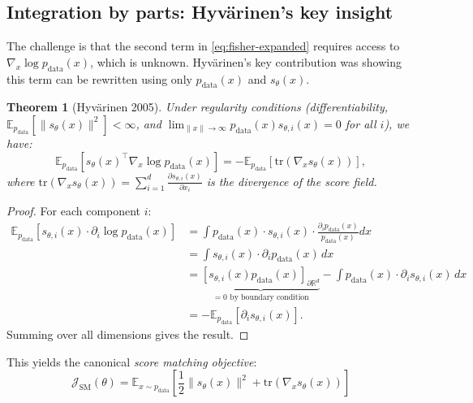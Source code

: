 \documentclass[11pt]{article}
\newtheorem{theorem}{Theorem}[section]
\theoremstyle{definition}
\begin{document}
\subsection{Integration by parts: Hyv\"arinen's key insight}
The challenge is that the second term in \eqref{eq:fisher-expanded} requires access to $\nabla_x \log p_{\text{data}}(x)$, which is unknown. 
Hyv\"arinen's key contribution was showing this term can be rewritten using only $p_{\text{data}}(x)$ and $s_\theta(x)$.

\begin{theorem}[Hyv\"arinen 2005]
Under regularity conditions (differentiability, $\mathbb{E}_{p_{\text{data}}}[\|s_\theta(x)\|^2]<\infty$, and 
$\lim_{\|x\|\to\infty}p_{\text{data}}(x)s_{\theta,i}(x)=0$ for all $i$), we have:
\begin{equation}
\mathbb{E}_{p_{\text{data}}}[s_\theta(x)^\top \nabla_x \log p_{\text{data}}(x)] 
= -\mathbb{E}_{p_{\text{data}}}[\text{tr}(\nabla_x s_\theta(x))],
\end{equation}
where $\text{tr}(\nabla_x s_\theta(x)) = \sum_{i=1}^d \frac{\partial s_{\theta,i}(x)}{\partial x_i}$ is the divergence of the score field.
\end{theorem}

\begin{proof}
For each component $i$:
\begin{align}
\mathbb{E}_{p_{\text{data}}}[s_{\theta,i}(x) \cdot \partial_i \log p_{\text{data}}(x)]
&= \int p_{\text{data}}(x) \cdot s_{\theta,i}(x) \cdot \frac{\partial_i p_{\text{data}}(x)}{p_{\text{data}}(x)} dx \nonumber\\
&= \int s_{\theta,i}(x) \cdot \partial_i p_{\text{data}}(x) \, dx \nonumber\\
&= \underbrace{\left[s_{\theta,i}(x) p_{\text{data}}(x)\right]_{\partial\mathbb{R}^d}}_{=0 \text{ by boundary condition}}
- \int p_{\text{data}}(x) \cdot \partial_i s_{\theta,i}(x) \, dx \nonumber\\
&= -\mathbb{E}_{p_{\text{data}}}[\partial_i s_{\theta,i}(x)].
\end{align}
Summing over all dimensions gives the result.
\end{proof}

This yields the canonical \emph{score matching objective}:
\begin{equation}
\label{eq:score-matching}
\boxed{
\mathcal{J}_{\text{SM}}(\theta)
= \mathbb{E}_{x\sim p_{\text{data}}}\left[\frac{1}{2} \|s_\theta(x)\|^2 + \text{tr}(\nabla_x s_\theta(x))\right]
}
\end{equation}
\end{document}
